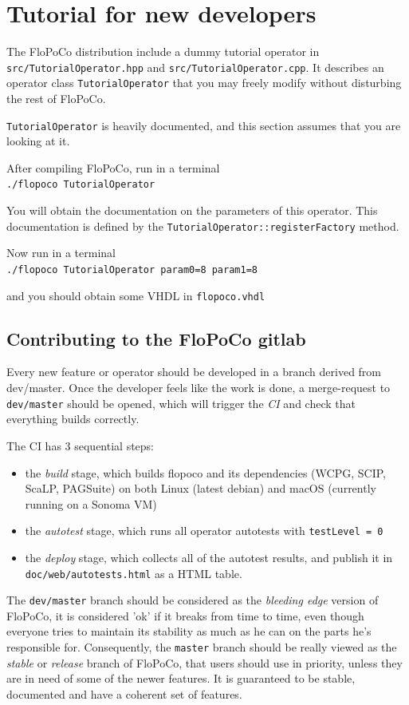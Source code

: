 \documentclass{article}
\begin{document}
\section{Tutorial for new developers \label{sec:tutorial}}

The FloPoCo distribution include a dummy tutorial operator in \texttt{src/TutorialOperator.hpp} and \texttt{src/TutorialOperator.cpp}.
It describes an operator class \texttt{TutorialOperator} that you may freely modify without disturbing the rest of FloPoCo.

\texttt{TutorialOperator} is heavily documented, and this section assumes that you are looking at it.

After compiling FloPoCo, run in a terminal\\
\verb!./flopoco TutorialOperator!

You will obtain the documentation on the parameters of this operator.
This documentation is defined by the \texttt{TutorialOperator::registerFactory} method.

Now run in a terminal\\
\verb!./flopoco TutorialOperator param0=8 param1=8!

and you should obtain  some VHDL in \texttt{flopoco.vhdl}

\subsection{Contributing to the FloPoCo gitlab}
Every new feature or operator should be developed in a branch derived from dev/master. 
Once the developer feels like the work is done, a merge-request to \texttt{dev/master} should be opened, which will trigger the \textit{CI} and check that everything builds correctly. 

The CI has 3 sequential steps: 
\begin{itemize}
  \item the \textit{build} stage, which builds flopoco and its dependencies (WCPG, SCIP, ScaLP, PAGSuite) on both Linux (latest debian) and macOS (currently running on a Sonoma VM)
  \item the \textit{autotest} stage, which runs all operator autotests with \texttt{testLevel = 0}
  \item the \textit{deploy} stage, which collects all of the autotest results, and publish it in \texttt{doc/web/autotests.html} as a HTML table.
\end{itemize}

The \texttt{dev/master} branch should be considered as the \textit{bleeding edge} version of FloPoCo, it is considered 'ok' if it breaks from time to time, even though everyone tries to maintain its stability as much as he can on the parts he's responsible for.
Consequently, the \texttt{master} branch should be really viewed as the \textit{stable} or \textit{release} branch of FloPoCo, that users should use in priority, unless they are in need of some of the newer features. It is guaranteed to be stable, documented and have a coherent set of features.
\end{document}
